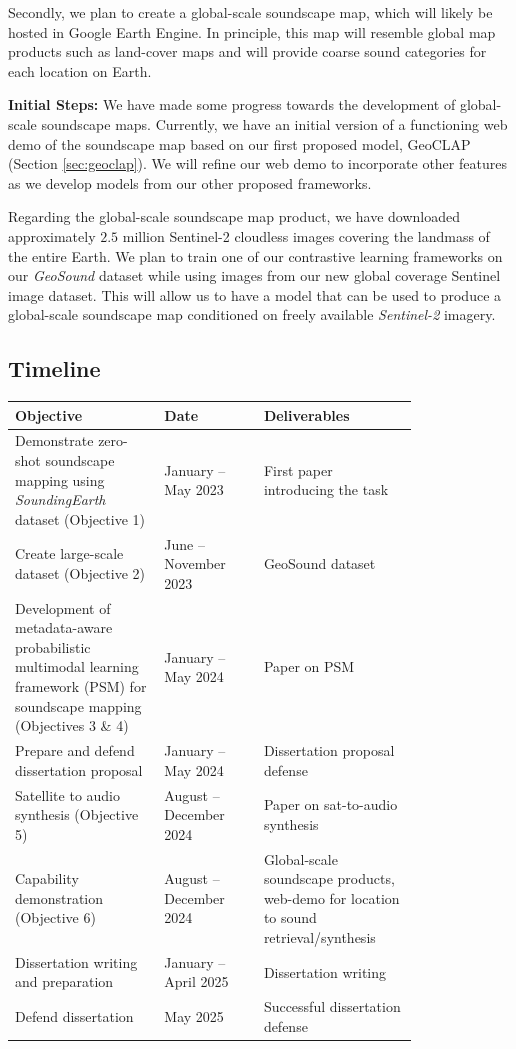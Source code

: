 Secondly, we plan to create a global-scale soundscape map, which will likely be hosted in Google Earth Engine. In principle, this map will resemble global map products such as land-cover maps and will provide coarse sound categories for each location on Earth.

\textbf{Initial Steps:} We have made some progress towards the development of global-scale soundscape maps. Currently, we have an initial version of a functioning web demo of the soundscape map based on our first proposed model, GeoCLAP (Section \ref{sec:geoclap}). We will refine our web demo to incorporate other features as we develop models from our other proposed frameworks.

Regarding the global-scale soundscape map product, we have downloaded approximately $2.5$ million Sentinel-2 cloudless images covering the landmass of the entire Earth. We plan to train one of our contrastive learning frameworks on our \textit{GeoSound} dataset while using images from our new global coverage Sentinel image dataset. This will allow us to have a model that can be used to produce a global-scale soundscape map conditioned on freely available \textit{Sentinel-2} imagery.

\subsection{Timeline}
\begin{tabular}{|>{\raggedright\arraybackslash}p{0.3\linewidth}|>{\raggedright\arraybackslash}p{0.2\linewidth}|>{\raggedright\arraybackslash}p{0.3\linewidth}|}
    \hline
    \textbf{Objective} & \textbf{Date} & \textbf{Deliverables} \\
    \hline
    Demonstrate zero-shot soundscape mapping using \textit{SoundingEarth} dataset (Objective 1) & January -- May 2023 & First paper introducing the task \\
    \hline
    Create large-scale dataset (Objective 2) & June -- November 2023 & GeoSound dataset \\
    \hline
    Development of metadata-aware probabilistic multimodal learning framework (PSM) for soundscape mapping (Objectives 3 \& 4) & January -- May 2024 & Paper on PSM \\
    \hline
    Prepare and defend dissertation proposal & January -- May 2024 & Dissertation proposal defense \\
    \hline
    Satellite to audio synthesis (Objective 5) & August -- December 2024 & Paper on sat-to-audio synthesis \\
    \hline
    Capability demonstration (Objective 6) & August -- December 2024 & Global-scale soundscape products, web-demo for location to sound retrieval/synthesis \\
    \hline
    Dissertation writing and preparation & January -- April 2025 & Dissertation writing \\
    \hline
    Defend dissertation & May 2025 & Successful dissertation defense \\
    \hline
\end{tabular}
